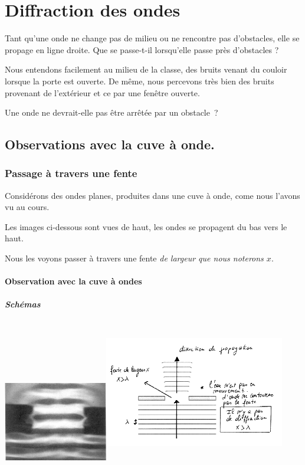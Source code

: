 \section{Diffraction des ondes}

Tant qu'une onde ne change pas de milieu ou ne rencontre pas
d'obstacles, elle se propage en ligne droite. Que se passe-t-il
lorsqu'elle passe près d'obstacles ?

Nous entendons facilement au milieu de la classe, des bruits venant du
couloir lorsque la porte est ouverte. De même, nous percevons très bien
des bruits provenant de l'extérieur et ce par une fenêtre ouverte.

Une onde ne devrait-elle pas être arrêtée par un obstacle~?

\subsection{Observations avec la cuve à onde. }

\subsubsection{Passage à travers une fente}

Considérons des ondes planes, produites dans une cuve à onde, come nous
l'avons vu au cours.

Les images ci-dessous sont vues de haut, les ondes se propagent du bas
vers le haut.

Nous les voyons passer à travers une fente \emph{de largeur que
nous noterons $x$}.

\paragraph{Observation avec la cuve à ondes}

\subparagraph{Schémas}

\includegraphics[width=4.546cm,height=3.468cm]{Pictures/1000000100000165000001102080785BE3C607F4.png}\includegraphics[width=7.895cm,height=6.091cm]{Pictures/10000001000002060000013F9C2B947BF01F091E.png}

